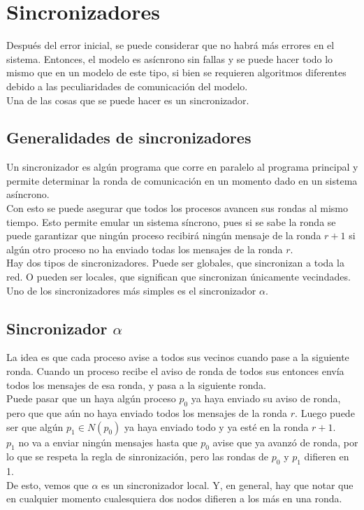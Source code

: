\documentclass[12pt,a4paper]{article}
\begin{document}
\section{Sincronizadores}{
    Después del error inicial, se puede considerar que no habrá más errores
    en el sistema. Entonces, el modelo es asícnrono sin fallas y se puede hacer
    todo lo mismo que en un modelo de este tipo, si bien se requieren algoritmos
    diferentes debido a las peculiaridades de comunicación del modelo.\\
    Una de las cosas que se puede hacer es un sincronizador.

    \subsection{Generalidades de sincronizadores}{
    Un sincronizador es algún programa que corre en paralelo al programa
    principal y permite determinar la ronda de comunicación en un momento dado
    en un sistema asíncrono. \\
    Con esto se puede asegurar que todos los procesos avancen sus rondas al
    mismo tiempo. Esto permite emular un sistema síncrono, pues si se sabe la
    ronda se puede garantizar que ningún proceso recibirá ningún mensaje de
    la ronda $r+1$ si algún otro proceso no ha enviado todas los mensajes de
    la ronda $r$.\\
    Hay dos tipos de sincronizadores. Puede ser globales, que sincronizan a
    toda la red. O pueden ser locales, que significan que sincronizan únicamente
    vecindades.\\
    Uno de los sincronizadores más simples es el sincronizador $\alpha$.
    }

    \subsection{Sincronizador $\alpha$}{
        La idea es que cada proceso avise a todos sus
        vecinos cuando pase a la siguiente ronda. Cuando un proceso recibe el
        aviso de ronda de todos sus entonces envía todos los mensajes de esa
        ronda, y pasa a la siguiente ronda.\\
        Puede pasar que un haya algún proceso $p_0$ ya haya enviado su aviso de
        ronda, pero que que aún no haya enviado todos los mensajes de la ronda
        $r$. Luego puede ser que algún $p_1 \in N(p_0)$ ya haya enviado todo y
        ya esté en la ronda $r+1$.\\
        $p_1$ no va a enviar ningún mensajes hasta que $p_0$ avise que ya avanzó de
        ronda, por lo que se respeta la regla de sinronización, pero las rondas
        de $p_0$ y $p_1$ difieren en 1.\\
        De esto, vemos que $\alpha$ es un sincronizador local.
        Y, en general, hay que notar que en cualquier momento cualesquiera dos nodos
        difieren a los más en una ronda.
    }

}
\end{document}

